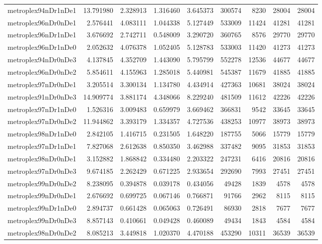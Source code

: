 \documentclass[../../../thesis.tex]{subfiles}
\begin{document}
\begin{longtable}{|l|r|r|r|r|r|r|r|r|}
metroplex94nDr1nDe1 & 13.791980 & 2.328913 & 1.316460 & 3.645373 & 300574 & 8230 & 28004 & 28004 \\
metroplex96nDr0nDe1 & 2.576441 & 4.083111 & 1.044338 & 5.127449 & 533009 & 11424 & 41281 & 41281 \\
metroplex96nDr1nDe1 & 3.676692 & 2.742711 & 0.548009 & 3.290720 & 360765 & 8576 & 29770 & 29770 \\
metroplex96nDr1nDe0 & 2.052632 & 4.076378 & 1.052405 & 5.128783 & 533003 & 11420 & 41273 & 41273 \\
metroplex94nDr0nDe3 & 4.137845 & 4.352709 & 1.443090 & 5.795799 & 552278 & 12536 & 44677 & 44677 \\
metroplex96nDr0nDe2 & 5.854611 & 4.155963 & 1.285018 & 5.440981 & 545387 & 11679 & 41885 & 41885 \\
metroplex97nDr0nDe1 & 3.205514 & 3.300134 & 1.134780 & 4.434914 & 427363 & 10681 & 38024 & 38024 \\
metroplex91nDr0nDe3 & 14.909774 & 3.881174 & 4.348066 & 8.229240 & 481509 & 11612 & 42226 & 42226 \\
metroplex97nDr1nDe0 & 1.526316 & 3.009483 & 0.659979 & 3.669462 & 366831 & 9542 & 33645 & 33645 \\
metroplex97nDr0nDe2 & 11.944862 & 3.393179 & 1.334357 & 4.727536 & 438253 & 10977 & 38973 & 38973 \\
metroplex98nDr1nDe0 & 2.842105 & 1.416715 & 0.231505 & 1.648220 & 187755 & 5066 & 15779 & 15779 \\
metroplex97nDr1nDe1 & 7.827068 & 2.612638 & 0.850350 & 3.462988 & 337482 & 9095 & 31853 & 31853 \\
metroplex98nDr0nDe1 & 3.152882 & 1.868842 & 0.334480 & 2.203322 & 247231 & 6416 & 20816 & 20816 \\
metroplex97nDr0nDe3 & 9.674185 & 2.262429 & 0.671225 & 2.933654 & 292690 & 7993 & 27451 & 27451 \\
metroplex99nDr0nDe2 & 8.238095 & 0.394878 & 0.039178 & 0.434056 & 49428 & 1839 & 4578 & 4578 \\
metroplex99nDr0nDe1 & 2.676692 & 0.699725 & 0.067146 & 0.766871 & 91766 & 2962 & 8115 & 8115 \\
metroplex99nDr1nDe0 & 2.894737 & 0.661428 & 0.065063 & 0.726491 & 86930 & 2818 & 7677 & 7677 \\
metroplex99nDr0nDe3 & 8.857143 & 0.410661 & 0.049428 & 0.460089 & 49434 & 1843 & 4584 & 4584 \\
metroplex98nDr0nDe2 & 8.085213 & 3.449818 & 1.020370 & 4.470188 & 453290 & 10311 & 36539 & 36539 \\

\end{longtable}
\end{document}
